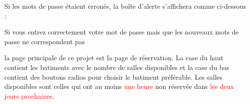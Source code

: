 \documentclass{article}
\begin{document}
\begin{enumerate}
 \newpage
  Si les mots de passe étaient erronés, la boîte d'alerte s'affichera comme ci-dessous :
  
   
  \vspace{0.7cm}
   
\hspace*{-0.7in}

               \noindent{}  
               
  
  
  Si vous entrez correctement votre mot de passe mais que les nouveaux mots de passe ne correspondent pas
  \vspace{0.7cm}
   
\hspace*{-0.7in}

               \noindent{}  
               
  
  la page principale de ce projet est la page de réservation. La case du haut contient les batiments avec le nombre de salles disponibles et la case du bas contient des boutons radios  pour choisir le batiment préférable. Les salles disponibles sont celles qui ont au moins \textcolor{red}{une heure} non réservée dans \textcolor{red}{les deux jours prochaines}.
  

\end{enumerate}
\end{document}
